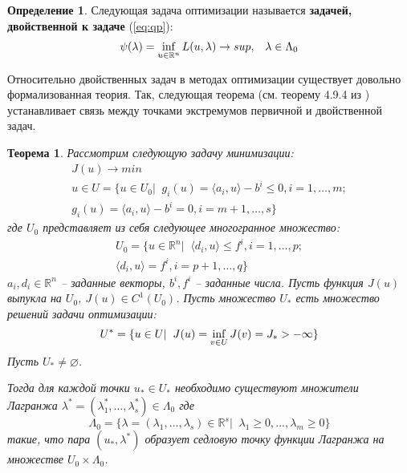 \documentclass[a4paper, 12pt, titlepage]{article}
\theoremstyle{definition}
\newtheorem{SmartDefinition}{Определение}
\theoremstyle{plain}
\newtheorem{SmartTheorem}{Теорема}
\theoremstyle{plain}
\begin{document}
\begin{SmartDefinition}
 Следующая задача оптимизации называется \textbf{задачей, двойственной к задаче}
 (\ref{eq:qp}):
 \begin{equation}
  \begin{aligned}
   \psi(\lambda) = \operatornamewithlimits{inf}_{u \in \mathbb{R}^{n}}
   L(u, \lambda) \to sup, \;\;\; \lambda \in \Lambda_{0}
  \end{aligned}
 \end{equation}
\end{SmartDefinition}

Относительно двойственных задач в методах оптимизации существует довольно
формализованная теория. Так, следующая теорема (см. теорему 4.9.4 
из \cite{Vasilev1980}) устанавливает связь между точками экстремумов
первичной и двойственной задач.

\begin{SmartTheorem}
 Рассмотрим следующую задачу минимизации:
 \begin{equation}
  \begin{aligned}
  J(u) \to min \\
  u \in U = \{u \in U_{0} | \;\;
  g_{i}(u) = \langle a_{i}, u \rangle  - b^{i} \leq 0, i = 1, \ldots, m; \\
  g_{i}(u) = \langle a_{i}, u \rangle  - b^{i} = 0, i = m + 1, \ldots, s \}
  \end{aligned}
 \end{equation}
 где $U_{0}$ представляет из себя следующее многогранное множество:
 \begin{equation}
  \begin{aligned}
   U_{0} = \{u \in \mathbb{R}^{n} | \;\;
   \langle d_{i}, u \rangle \leq f^{i}, i = 1, \ldots, p; \\
   \langle d_{i}, u \rangle = f^{i}, i = p + 1, \ldots, q \}
  \end{aligned}
 \end{equation}
 $a_{i}, d_{i} \in \mathbb{R}^{n}$ -- заданные векторы, $b^{i}, f^{i}$ --
 заданные числа.
 Пусть функция $J(u)$ выпукла на $U_{0}$, $J(u) \in C^{1}(U_{0})$.
 Пусть множество $U_{*}$ есть множество решений задачи оптимизации:
 \begin{equation}
  U^{*} = \{u \in U | \;\; J(u) = \operatornamewithlimits{inf}_{v \in U} J(v)
  = J_{*} > - \infty\}
 \end{equation}
 Пусть $U_{*} \neq \varnothing$.
 
 Тогда для каждой точки $u_{*} \in U_{*}$ необходимо существуют множители
 Лагранжа
 $\lambda^{*} = (\lambda_{1}^{*}, \ldots, \lambda_{s}^{*}) \in \Lambda_{0}$
 где
 \begin{equation}
  \Lambda_{0} = \{\lambda = (\lambda_{1}, \ldots, \lambda_{s})
  \in \mathbb{R}^{s} | \;\; \lambda_{1} \geq 0, \ldots, \lambda_{m} \geq 0 \}
 \end{equation}
 такие, что пара $(u_{*}, \lambda^{*})$ образует седловую точку функции Лагранжа
 на множестве $U_{0} \times \Lambda_{0}$.
\end{SmartTheorem}
\end{document}
